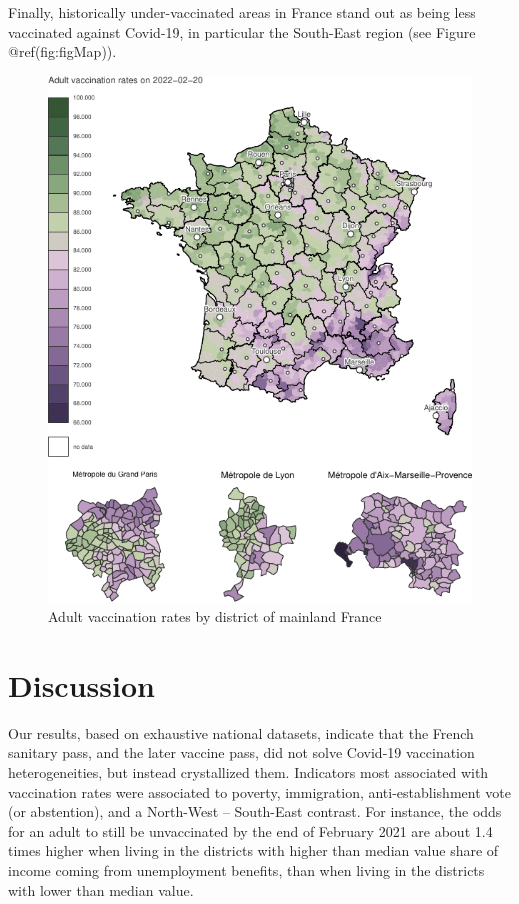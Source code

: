 \documentclass[
]{article}
\begin{document}
Finally, historically under-vaccinated areas in France stand out as
being less vaccinated against Covid-19, in particular the South-East
region (see Figure @ref(fig:figMap)).

\begin{figure}
\centering
\includegraphics{ms_files/figure-latex/figMap-1.pdf}
\caption{Adult vaccination rates by district of mainland France}
\end{figure}

\hypertarget{discussion}{%
\section{Discussion}\label{discussion}}

Our results, based on exhaustive national datasets, indicate that the
French sanitary pass, and the later vaccine pass, did not solve Covid-19
vaccination heterogeneities, but instead crystallized them. Indicators
most associated with vaccination rates were associated to poverty,
immigration, anti-establishment vote (or abstention), and a North-West
-- South-East contrast. For instance, the odds for an adult to still be
unvaccinated by the end of February 2021 are about 1.4 times higher when
living in the districts with higher than median value share of income
coming from unemployment benefits, than when living in the districts
with lower than median value.
\end{document}
